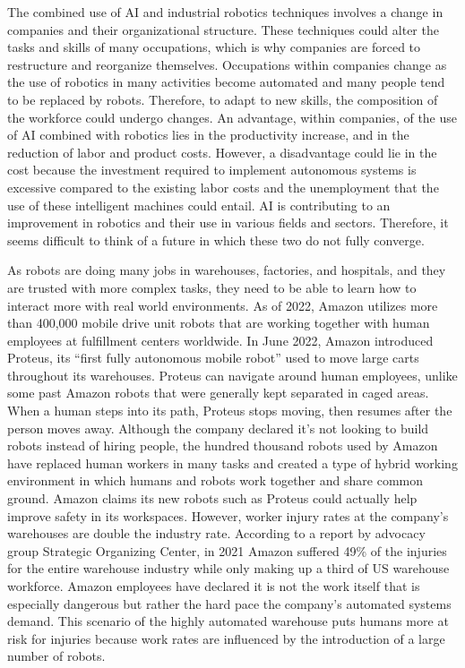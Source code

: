 The combined use of AI and industrial robotics techniques involves a change in companies and their organizational structure. These techniques could alter the tasks and skills of many occupations, which is why companies are forced to restructure and reorganize themselves. Occupations within companies change as the use of robotics in many activities become automated and many people tend to be replaced by robots. Therefore, to adapt to new skills, the composition of the workforce could undergo changes. An advantage, within companies, of the use of AI combined with robotics lies in the productivity increase, and in the reduction of labor and product costs. However, a disadvantage could lie in the cost because the investment required to implement autonomous systems is excessive compared to the existing labor costs and the unemployment that the use of these intelligent machines could entail. AI is contributing to an improvement in robotics and their use in various fields and sectors. Therefore, it seems difficult to think of a future in which these two do not fully converge.

As robots are doing many jobs in warehouses, factories, and hospitals, and they are trusted with more complex tasks, they need to be able to learn how to interact more with real world environments. As of 2022, Amazon utilizes more than 400,000 mobile drive unit robots that are working together with human employees at fulfillment centers worldwide. In June 2022, Amazon introduced Proteus, its ``first fully autonomous mobile robot'' used to move large carts throughout its warehouses. Proteus can navigate around human employees, unlike some past Amazon robots that were generally kept separated in caged areas. When a human steps into its path, Proteus stops moving, then resumes after the person moves away. Although the company declared it's not looking to build robots instead of hiring people, the hundred thousand robots used by Amazon have replaced human workers in many tasks and created a type of hybrid working environment in which humans and robots work together and share common ground. Amazon claims its new robots such as Proteus could actually help improve safety in its workspaces. However, worker injury rates at the company's warehouses are double the industry rate. According to a report by advocacy group Strategic Organizing Center, in 2021 Amazon suffered 49\% of the injuries for the entire warehouse industry while only making up a third of US warehouse workforce. Amazon employees have declared it is not the work itself that is especially dangerous but rather the hard pace the company's automated systems demand. This scenario of the highly automated warehouse puts humans more at risk for injuries because work rates are influenced by the introduction of a large number of robots.

